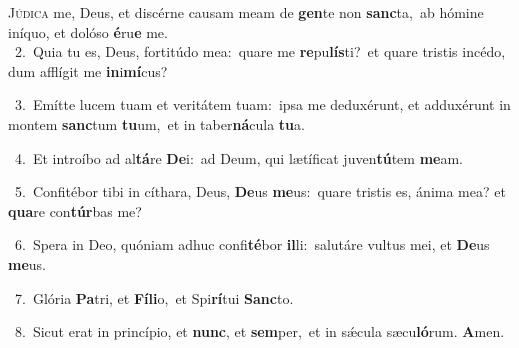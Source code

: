 \lettrine{\initial\textcolor{\initialcolor}{J}}{údica} me, Deus, et discérne causam meam de \textbf{gen}\-te non \textbf{sanc}\-ta,~\star ab hómine iníquo, et dolóso \textbf{é}\-ru\textbf{e} me.\\
{\numbfont\textcolor{\numbcolor}{~2.}}~Quia tu es, Deus, fortitúdo mea:~\dagger quare me \textbf{re}\-pu\-\textbf{lís}\-ti?~\star et quare tristis incédo, dum afflígit me \textbf{in}\-i\-\textbf{mí}\-cus?\par
{\numbfont\textcolor{\numbcolor}{~3.}}~Emítte lucem tuam et veritátem tuam:~\dagger ipsa me deduxérunt, et adduxérunt in montem \textbf{sanc}\-tum \textbf{tu}\-um,~\star et in taber\-\textbf{ná}\-cula \textbf{tu}\-a.\par
{\numbfont\textcolor{\numbcolor}{~4.}}~Et introíbo ad al\-\textbf{tá}\-re \textbf{De}\-i:~\star ad Deum, qui lætíficat juven\-\textbf{tú}\-tem \textbf{me}\-am.\par
{\numbfont\textcolor{\numbcolor}{~5.}}~Confitébor tibi in cíthara, Deus, \textbf{De}\-us \textbf{me}\-us:~\star quare tristis es, ánima mea? et \textbf{qua}\-re con\-\textbf{túr}\-bas me?\par
{\numbfont\textcolor{\numbcolor}{~6.}}~Spera in Deo, quóniam adhuc confi\-\textbf{té}\-bor \textbf{il}\-li:~\star salutáre vultus mei, et \textbf{De}\-us \textbf{me}\-us.\par
{\numbfont\textcolor{\numbcolor}{~7.}}~Glória \textbf{Pa}\-tri, et \textbf{Fí}\-\textbf{li}o,~\star et Spi\-\textbf{rí}\-tui \textbf{Sanc}\-to.\par
{\numbfont\textcolor{\numbcolor}{~8.}}~Sicut erat in princípio, et \textbf{nunc}\-, et \textbf{sem}\-per,~\star et in sǽcula sæcu\-\textbf{ló}\-rum. \textbf{A}\-men.\par
